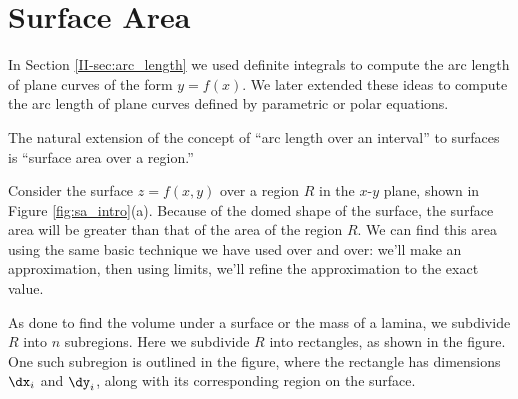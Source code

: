 \section{Surface Area}\label{sec:surface_area}

In Section \ref{II-sec:arc_length} we used definite integrals to compute the arc length of plane curves of the form $y=f(x)$. We later extended these ideas to compute the arc length of plane curves defined by parametric or polar equations. 

The natural extension of the concept of ``arc length over an interval'' to surfaces is ``surface area over a region.'' 

Consider the surface $z=f(x,y)$ over a region $R$ in the $x$-$y$ plane, shown in Figure \ref{fig:sa_intro}(a). Because of the domed shape of the surface, the surface area will be greater than that of the area of the region $R$. We can find this area using the same basic technique we have used over and over: we'll make an approximation, then using limits, we'll refine the approximation to the exact value.

As done to find the volume under a surface or the mass of a lamina, we subdivide $R$ into $n$ subregions. Here we subdivide $R$ into rectangles, as shown in the figure. One such subregion is outlined in the figure, where the rectangle has dimensions $\dx_i$ and $\dy_i$, along with its corresponding region on the surface.

